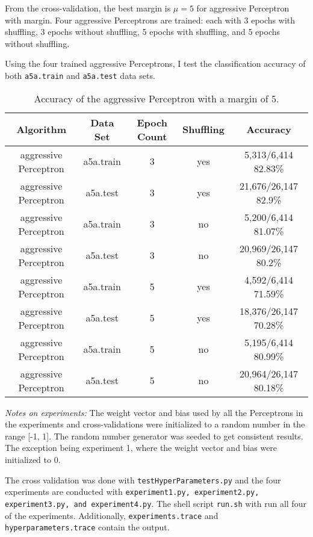 \documentclass[11pt]{article}
\begin{document}
From the cross-validation, the best margin is $\mu = 5$ for aggressive Perceptron with margin. Four aggressive Perceptrons are trained: each with 3 epochs with shuffling, 3 epochs without shuffling, 5 epochs with shuffling, and 5 epochs without shuffling. \newline




 \newline

Using the four trained aggressive Perceptrons, I test the classification accuracy of both \texttt{a5a.train} and \texttt{a5a.test} data sets.

\begin{table}[H]
\centering
{\renewcommand{\arraystretch}{1.2}%
\begin{tabular}{| c | c | c | c | c |}
\hline
Algorithm& Data Set & Epoch Count & Shuffling & Accuracy\\
\hline
aggressive Perceptron & a5a.train & 3 & yes & 5,313/6,414 82.83\%\\ \hline
aggressive Perceptron & a5a.test & 3 & yes & 21,676/26,147 82.9\%\\ \hline
aggressive Perceptron & a5a.train & 3 & no & 5,200/6,414 81.07\%\\ \hline
aggressive Perceptron & a5a.test & 3 & no & 20,969/26,147 80.2\%\\ \hline
aggressive Perceptron & a5a.train & 5 & yes & 4,592/6,414 71.59\%\\ \hline
aggressive Perceptron & a5a.test & 5 & yes & 18,376/26,147 70.28\%\\ \hline
aggressive Perceptron & a5a.train & 5 & no & 5,195/6,414 80.99\%\\ \hline
aggressive Perceptron & a5a.test & 5 & no & 20,964/26,147 80.18\%\\ \hline
\end{tabular}}
\caption{Accuracy of the aggressive Perceptron with a margin of 5.}
\end{table}

\textit{Notes on experiments:} The weight vector and bias used by all the Perceptrons in the experiments and cross-validations were initialized to a random number in the range [-1, 1]. The random number generator was seeded to get consistent results. The exception being experiment 1, where the weight vector and bias were initialized to 0. 

The cross validation was done with \texttt{testHyperParameters.py} and the four experiments are conducted with \texttt{experiment1.py, experiment2.py, experiment3.py, and experiment4.py}. The shell script \texttt{run.sh} with run all four of the experiments. Additionally, \texttt{experiments.trace} and \texttt{hyperparameters.trace} contain the output.
\end{document}
